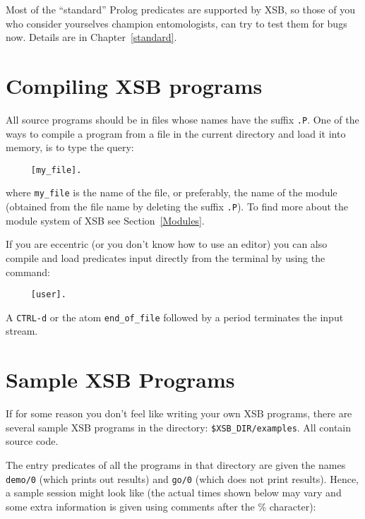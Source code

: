 Most of the ``standard'' Prolog predicates are supported by XSB, 
so those of you who consider yourselves champion entomologists, can try
to test them for bugs now.  Details are in Chapter~\ref{standard}.


\section{Compiling XSB programs}

All source programs should be in files whose names have the 
suffix {\tt .P}.  One of the ways to compile a program from a file in 
the current directory and load it into memory, is to type the query:
\begin{verbatim}
     [my_file].
\end{verbatim}
where \verb'my_file' is the name of the file, or preferably, the name
of the module (obtained from the file name by deleting the suffix {\tt .P}).
To find more about the module system of XSB see Section~\ref{Modules}.

If you are eccentric (or you don't know how to use an editor) you can also 
compile and load predicates input directly from the terminal by using the
command:
\begin{verbatim}
     [user].
\end{verbatim}
A {\tt CTRL-d} or the atom \verb'end_of_file' followed by a period 
terminates the input stream.


\section{Sample XSB Programs}

If for some reason you don't feel like writing your own XSB programs, 
there are several sample XSB programs in the directory: 
\verb'$XSB_DIR/examples'.  All contain source code.

The entry predicates of all the programs in that directory are given
the names {\tt demo/0} (which prints out results) and {\tt go/0}
(which does not print results). Hence, a sample session might look like
(the actual times shown below may vary and some extra information is given
using comments after the \% character):

